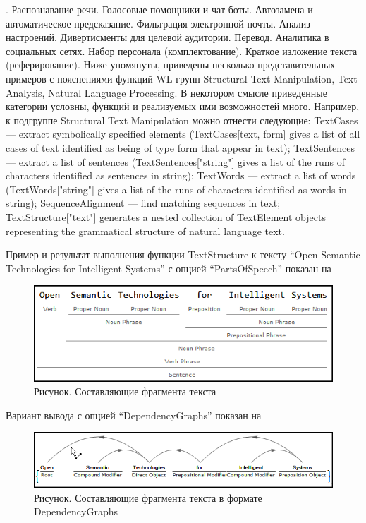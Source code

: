 .
Распознавание речи. Голосовые помощники и чат-боты. Автозамена и автоматическое предсказание. Фильтрация электронной почты. Анализ настроений. Дивертисменты для целевой аудитории. Перевод. Аналитика в социальных сетях. Набор персонала (комплектование). Краткое изложение текста (реферирование). 
Ниже упомянуты, приведены несколько представительных примеров с пояснениями функций WL групп Structural Text Manipulation, Text Analysis, Natural Language Processing. 
В некотором смысле приведенные категории условны, функций и реализуемых ими возможностей много. Например, к подгруппе Structural Text Manipulation можно отнести следующие: 
TextCases --- extract symbolically specified elements (TextCases[text, form] gives a list of all cases of text identified as being of type form that appear in text); TextSentences --- extract a list of sentences (TextSentences["string"] gives a list of the runs of characters identified as sentences in string); TextWords --- extract a list of words (TextWords["string"] gives a list of the runs of characters identified as words in string); SequenceAlignment --- find matching sequences in text; TextStructure["text"] generates a nested collection of TextElement objects representing the grammatical structure of natural language text.

Пример и результат выполнения функции TextStructure к тексту ``Open Semantic Technologies for Intelligent Systems'' с опцией ``PartsOfSpeech'' показан на \textit{}
\begin{figure}[H]
	\includegraphics[scale=0.8]{images/part7/chapter_integration/integr_alg4.png}
	\caption{Рисунок. Составляющие фрагмента текста}
	\label{fig:integr_alg4}
\end{figure}

Вариант вывода с опцией ``DependencyGraphs'' показан на \textit{}
\begin{figure}[H]
	\includegraphics[scale=0.71]{images/part7/chapter_integration/integr_alg5.png}
	\caption{Рисунок. Составляющие фрагмента текста в формате DependencyGraphs}
	\label{fig:integr_alg5}
\end{figure}

